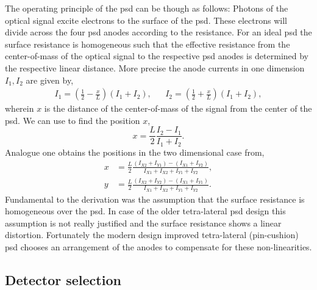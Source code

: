 The operating principle of the \gls{psd} can be though as follows:
Photons of the optical signal excite electrons to the surface of the \gls{psd}.
These electrons will divide across the four \gls{psd} anodes according to the resistance.
For an ideal \gls{psd} the surface resistance is homogeneous such that the effective resistance from the center-of-mass of the optical signal to the respective \gls{psd} anodes is determined by the respective linear distance.
More precise the anode currents in one dimension $I_1,I_2$ are given by,
\begin{align}
	I_1=\left(\frac{1}{2}-\frac{x}{L}\right)\left(I_1+I_2\right), &&
	I_2=\left(\frac{1}{2}+\frac{x}{L}\right)\left(I_1+I_2\right),
	\label{eq:psd_anode_current}
\end{align}
wherein $x$ is the distance of the center-of-mass of the signal from the center of the \gls{psd}.
We can use  to find the position $x$,
\begin{equation}
	x=\frac{L}{2}\frac{I_2-I_1}{I_1+I_2}
	\label{eq:psd_position_1d}.
\end{equation}
Analogue one obtains the positions in the two dimensional case from,
\begin{align}
	x&=\frac{L}{2}\frac{(I_{X2}+I_{Y1})-(I_{X1}+I_{Y2})}{I_{X1}+I_{X2}+I_{Y1}+I_{Y2}},\\
	y&=\frac{L}{2}\frac{(I_{X2}+I_{Y2})-(I_{X1}+I_{Y1})}{I_{X1}+I_{X2}+I_{Y1}+I_{Y2}}	
	\label{eq:psd_position_2d}.	
\end{align}
Fundamental to the derivation was the assumption that the surface resistance is homogeneous over the \gls{psd}.
In case of the older tetra-lateral \gls{psd} design this assumption is not really justified and the surface resistance shows a linear distortion.
Fortunately the modern design improved tetra-lateral (pin-cushion) \gls{psd} chooses an arrangement of the anodes to compensate for these non-linearities.

\subsection{Detector selection}

